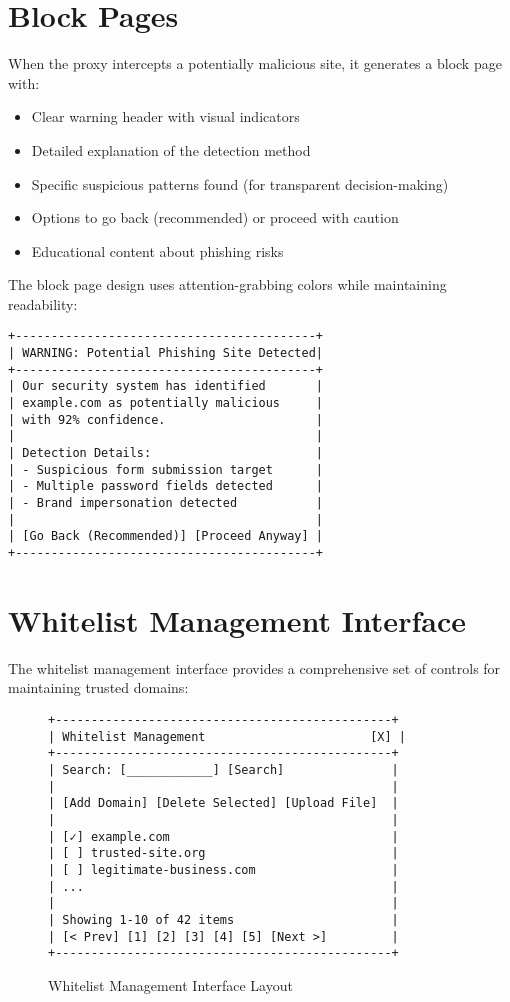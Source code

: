 \section{Block Pages}

When the proxy intercepts a potentially malicious site, it generates a block page with:

\begin{itemize}
    \item Clear warning header with visual indicators
    \item Detailed explanation of the detection method
    \item Specific suspicious patterns found (for transparent decision-making)
    \item Options to go back (recommended) or proceed with caution
    \item Educational content about phishing risks
\end{itemize}

The block page design uses attention-grabbing colors while maintaining readability:

\begin{verbatim}
+------------------------------------------+
| WARNING: Potential Phishing Site Detected|
+------------------------------------------+
| Our security system has identified       |
| example.com as potentially malicious     |
| with 92% confidence.                     |
|                                          |
| Detection Details:                       |
| - Suspicious form submission target      |
| - Multiple password fields detected      |
| - Brand impersonation detected           |
|                                          |
| [Go Back (Recommended)] [Proceed Anyway] |
+------------------------------------------+
\end{verbatim}

\section{Whitelist Management Interface}

The whitelist management interface provides a comprehensive set of controls for maintaining trusted domains:

\begin{figure}[h]
\centering
\begin{verbatim}
+-----------------------------------------------+
| Whitelist Management                       [X] |
+-----------------------------------------------+
| Search: [____________] [Search]               |
|                                               |
| [Add Domain] [Delete Selected] [Upload File]  |
|                                               |
| [✓] example.com                               |
| [ ] trusted-site.org                          |
| [ ] legitimate-business.com                   |
| ...                                           |
|                                               |
| Showing 1-10 of 42 items                      |
| [< Prev] [1] [2] [3] [4] [5] [Next >]         |
+-----------------------------------------------+
\end{verbatim}
\caption{Whitelist Management Interface Layout}
\end{figure}

